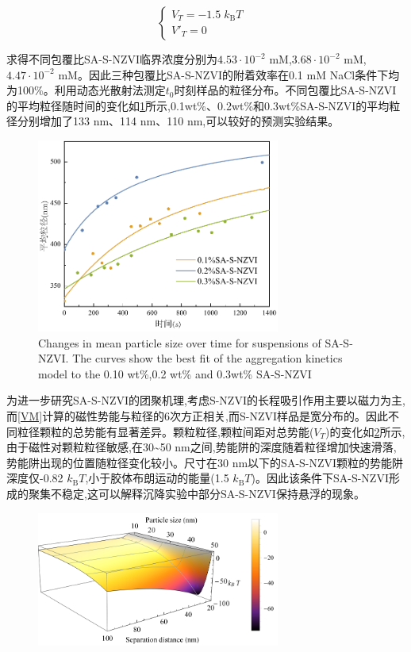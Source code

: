\begin{equation}
    \left\{
        \begin{array}{lcl} 
            V_T=-1.5\; k_\mathrm{B}T& \\
            V'_T=0 &
        \end{array}\right.
\end{equation}

求得不同包覆比SA-S-NZVI临界浓度分别为$4.53\cdot10^{-2}$ mM,$3.68\cdot10^{-2}$ mM,$4.47 \cdot 10^{-2}$ mM。因此三种包覆比SA-S-NZVI的附着效率在0.1 mM NaCl条件下均为100\%。利用动态光散射法测定$t_0$时刻样品的粒径分布。不同包覆比SA-S-NZVI的平均粒径随时间的变化如\cref{fig2}所示,0.1wt\%、0.2wt\%和0.3wt\%SA-S-NZVI的平均粒径分别增加了133 nm、114 nm、110 nm,可以较好的预测实验结果。

\begin{figure}[h]
    \centering
    \includegraphics[width=8cm]{figs/fig2.pdf}
    \caption{Changes in mean particle size over time for suspensions of SA-S-NZVI. The curves show the best fit of the aggregation kinetics model to the 0.10 wt\%,0.2 wt\% and 0.3wt\% SA-S-NZVI}\label{fig2}
\end{figure}

为进一步研究SA-S-NZVI的团聚机理,考虑S-NZVI的长程吸引作用主要以磁力为主,而\cref{VM}计算的磁性势能与粒径的6次方正相关,而S-NZVI样品是宽分布的。因此不同粒径颗粒的总势能有显著差异。颗粒粒径,颗粒间距对总势能($V_T$)的变化如\cref{fig12}所示,由于磁性对颗粒粒径敏感,在30\textasciitilde50 nm之间,势能阱的深度随着粒径增加快速滑落,势能阱出现的位置随粒径变化较小。尺寸在30 nm以下的SA-S-NZVI颗粒的势能阱深度仅-0.82 $k_\mathrm{B}T$,小于胶体布朗运动的能量(1.5 $k_\mathrm{B}T$)。因此该条件下SA-S-NZVI形成的聚集不稳定,这可以解释沉降实验中部分SA-S-NZVI保持悬浮的现象。

\begin{figure}[h]
    \centering
    \includegraphics[width=8cm]{figs/fig12.pdf}
    \label{fig12}
\end{figure}

